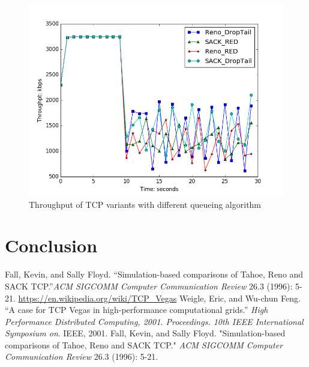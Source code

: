 \documentclass[10pt, conference]{IEEEtran/IEEEtran}
\begin{document}
\begin{figure}[htbp]
\begin{center}
\includegraphics[width=\linewidth]{../exp3/exp3_thpt.png}
\caption{Throughput of TCP variants with different queueing algorithm}
\label{exp3_thpt}
\end{center}
\end{figure}
\section{Conclusion}

\begin{thebibliography}{50}
 Fall, Kevin, and Sally Floyd. ``Simulation-based comparisons of Tahoe, Reno and SACK TCP.''\textit{ACM SIGCOMM Computer Communication Review}
 26.3 (1996): 5-21.
   \url{https://en.wikipedia.org/wiki/TCP_Vegas}
  Weigle, Eric, and Wu-chun Feng. ``A case for TCP Vegas in high-performance computational grids.'' 
 \textit{High Performance Distributed Computing, 2001. Proceedings. 10th IEEE International Symposium on}. IEEE, 2001.  Fall, Kevin, and Sally Floyd. "Simulation-based comparisons of Tahoe, Reno and SACK TCP." \textit{ACM SIGCOMM Computer Communication Review}
 26.3 (1996): 5-21.

\end{thebibliography}
\end{document}
